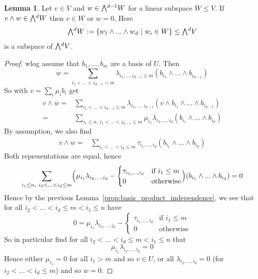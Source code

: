 \documentclass{scrartcl}
\newcommand{\extpow}{\mathchoice{{\textstyle\bigwedge}}
    {{\bigwedge}}
    {{\textstyle\wedge}}
    {{\scriptstyle\wedge}}}
\theoremstyle{definition}
\newtheorem{lemma}[subsection]{Lemma}
\begin{document}
\begin{lemma}
    \label{prop:subspace_closed}
    Let $v \in V$ and $w \in \extpow^{d - 1} W$ for a linear subspace $W \leq V$. 
    If $v \wedge w \in \extpow^d W$ then $v \in W$ or $w = 0$.
    Here
    \begin{equation*}
        \extpow^d W := \{ w_1 \wedge ... \wedge w_d \ | \ w_i \in W \} \leq \extpow^d V
    \end{equation*}
    is a subspace of $\extpow^d V$.
\end{lemma}
\begin{proof}
    wlog assume that $b_1, ..., b_m$ are a basis of $U$.
    Then
    \begin{equation*}
        w = \sum_{i_1 < ... < i_{d - 1} < m} \lambda_{i_1, ..., i_{d - 1} \leq m} (b_{i_1} \wedge ... \wedge b_{i_{d - 1}})
    \end{equation*}
    So with $v = \sum_i \mu_i b_i$ get
    \begin{align*}
        v \wedge w =& \sum_{i_1 < ... < i_{d - 1} \leq m} \lambda_{i_1, ..., i_{d - 1}} (v \wedge b_{i_1} \wedge ... \wedge b_{i_{d - 1}}) \\
        =& \sum_{i_1 \leq n, \ i_1 < ... < i_{d - 1} \leq m} \mu_{i_1} \lambda_{i_2, ..., i_d} (b_{i_1} \wedge ... \wedge b_{i_d})
    \end{align*}
    By assumption, we also find
    \begin{align*}
        v \wedge w =& \sum_{i_1 < ... < i_d \leq m} \tau_{i_1, ..., i_d} (b_{i_1} \wedge ... \wedge b_{i_d})
    \end{align*}
    Both representations are equal, hence
    \begin{equation*}
        \sum_{i_1 \leq n, \ i_2 < ... < i_d \leq m} \Bigl( \mu_{i_1}\lambda_{i_2, ..., i_d} - \begin{cases}
            \tau_{i_1, ..., i_d} & \text{if $i_1 \leq m$} \\
            0 & \text{otherwise}
        \end{cases} \Bigr) (b_{i_1} \wedge ... \wedge b_{i_d}) = 0
    \end{equation*}
    Hence by the previous Lemma~\ref{prop:basis_product_independence}, we see that for all $i_2 < ... < i_d \leq m < i_1 \leq n$ have
    \begin{equation*}
        0 = \mu_{i_1}\lambda_{i_2, ..., i_d} - \begin{cases}
            \tau_{i_1, ..., i_d} & \text{if $i_1 \leq m$} \\
            0 & \text{otherwise}
        \end{cases}
    \end{equation*}
    So in particular find for all $i_2 < ... < i_d \leq m < i_1 \leq n$ that
    \begin{equation*}
        \mu_{i_1} \lambda_{i_2, ..., i_d} = 0
    \end{equation*}
    Hence either $\mu_{i_1} = 0$ for all $i_1 > m$ and so $v \in U$, or all $\lambda_{i_2, ..., i_d} = 0$ (for $i_2 < ... < i_d \leq m$) and so $w = 0$.
\end{proof}
\end{document}
